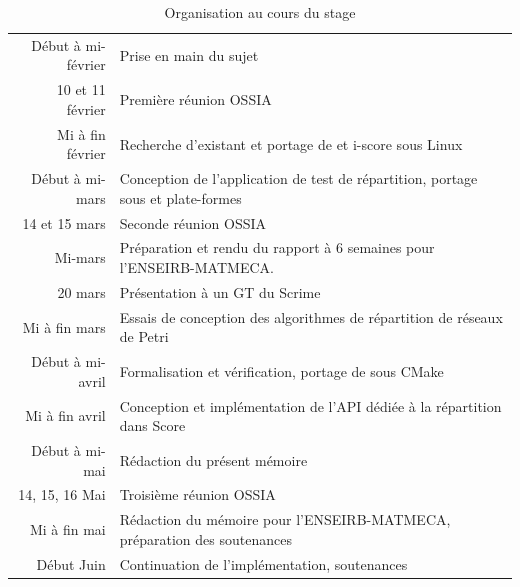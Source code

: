 \begin{table}[H]
	\centering
	\begin{tabu} to 
		Début à mi-février & Prise en main du sujet \newline \\
		10 et 11 février & Première réunion \ac{OSSIA} \newline \\
		Mi à fin février & Recherche d'existant et portage de  et i-score sous Linux \newline \\
		Début à mi-mars & Conception de l'application de test de répartition, portage sous  et plate-formes  \newline \\
		14 et 15 mars & Seconde réunion \ac{OSSIA} \newline \\
		Mi-mars & Préparation et rendu du rapport à 6 semaines pour l'ENSEIRB-MATMECA. \newline \\
		20 mars & Présentation à un GT du Scrime \newline \\
		Mi à fin mars &  Essais de conception des algorithmes de répartition de réseaux de Petri \newline \\
		Début à mi-avril & Formalisation et vérification, portage de  sous \gls{CMake} \newline \\
		Mi à fin avril & Conception et implémentation de l'\ac{API} dédiée à la répartition dans Score \newline \\
		Début à mi-mai & Rédaction du présent mémoire \newline \\
		14, 15, 16 Mai & Troisième réunion \ac{OSSIA} \newline \\
		Mi à fin mai & Rédaction du mémoire pour l'ENSEIRB-MATMECA, préparation des soutenances \newline \\
		Début Juin & Continuation de l'implémentation, soutenances \\
	\end{tabu}
	\caption{Organisation au cours du stage}
	\label{tbl.Timeline}
\end{table}